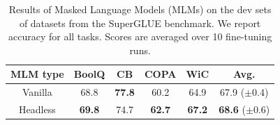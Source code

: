 \begin{table}
\centering
{}
\caption{Results of Masked Language Models (MLMs) on the dev sets of the GLUE benchmark. Best results are \textbf{bold} and second best are \underline{underlined}. We report Matthews' correlation for COLA, Spearman correlation for STS-B, and accuracy elsewhere. MNLI validation datasets are concatenated. All scores are averaged over 3 different seeds.}
\label{tab:glue_res}
\end{table}

\begin{table}
\centering
\small
\begin{tabular}{@{}c|ccccc@{}}
\toprule
MLM type & BoolQ          & CB             & COPA           & WiC            & Avg.           \\ \midrule
Vanilla  & 68.8          & \textbf{77.8} & 60.2          & 64.9          & 67.9 \tiny{($\pm$0.4)}          \\ 
Headless & \textbf{69.8} & 74.7          & \textbf{62.7} & \textbf{67.2} & \textbf{68.6} \tiny{($\pm$0.6)} \\ \bottomrule
\end{tabular}
\caption{Results of Masked Language Models (MLMs) on the dev sets of datasets from the SuperGLUE benchmark. We report accuracy for all tasks. Scores are averaged over 10 fine-tuning runs.}
\end{table}

